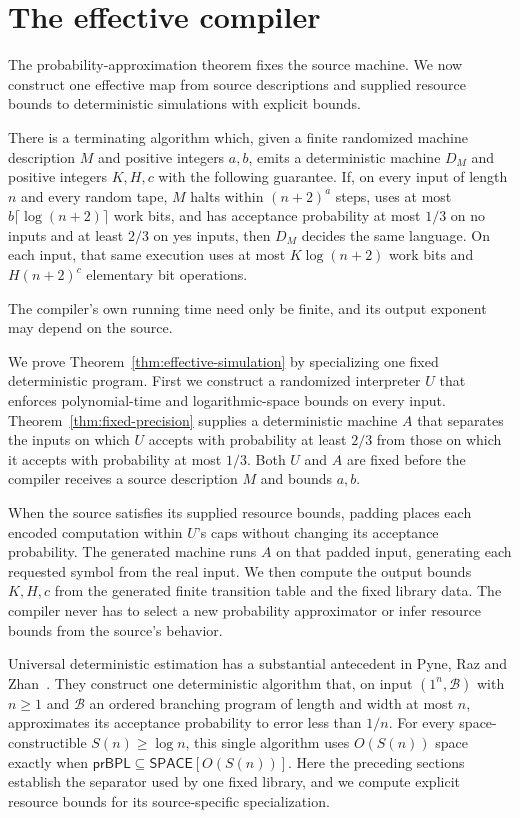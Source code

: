 \section{The effective compiler}
\label{sec:compiler}

The probability-approximation theorem fixes the source machine. We now
construct one effective map from source descriptions and supplied
resource bounds to deterministic simulations with explicit bounds.

\begin{theorem}
\label{thm:effective-simulation}
There is a terminating algorithm which, given a finite randomized machine
description $M$ and positive integers $a,b$, emits a deterministic
machine $D_M$ and positive integers $K,H,c$ with the following guarantee.
If, on every input of length $n$ and every random tape, $M$ halts within
$(n+2)^a$ steps, uses at most $b\lceil\log(n+2)\rceil$ work bits, and
has acceptance probability at most $1/3$ on no inputs and at least
$2/3$ on yes inputs, then $D_M$ decides the same language. On each input,
that same execution uses at most $K\log(n+2)$ work bits and
$H(n+2)^c$ elementary bit operations.
\end{theorem}

The compiler's own running time need only be finite, and its output
exponent may depend on the source.

We prove Theorem~\ref{thm:effective-simulation} by specializing one
fixed deterministic program. First we construct a randomized interpreter
$U$ that enforces polynomial-time and logarithmic-space bounds on every
input. Theorem~\ref{thm:fixed-precision} supplies a deterministic machine
$A$ that separates the inputs on which $U$ accepts with probability at
least $2/3$ from those on which it accepts with probability at most
$1/3$. Both $U$ and $A$ are fixed before the compiler receives a source
description $M$ and bounds $a,b$.

When the source satisfies its supplied resource bounds, padding places
each encoded computation within $U$'s caps without changing its
acceptance probability. The generated machine runs $A$ on that padded input, generating each requested
symbol from the real input. We then compute the output bounds $K,H,c$
from the generated finite transition table and the fixed library data.
The compiler never has to select a new probability approximator or infer
resource bounds from the source's behavior.

Universal deterministic estimation has a substantial antecedent in
Pyne, Raz and Zhan~\cite[full version, Theorem~5.1]{PyneRazZhan2023}.
They construct one deterministic algorithm that, on input $(1^n,\mathcal B)$
with $n\ge1$ and $\mathcal B$ an ordered branching program of length
and width at most $n$, approximates its acceptance probability to error less than
$1/n$. For every space-constructible $S(n)\ge\log n$, this single
algorithm uses $O(S(n))$ space exactly when
$\mathsf{prBPL}\subseteq\mathsf{SPACE}[O(S(n))]$.
Here the preceding sections establish the separator used by one fixed
library, and we compute explicit resource bounds for its source-specific
specialization.

